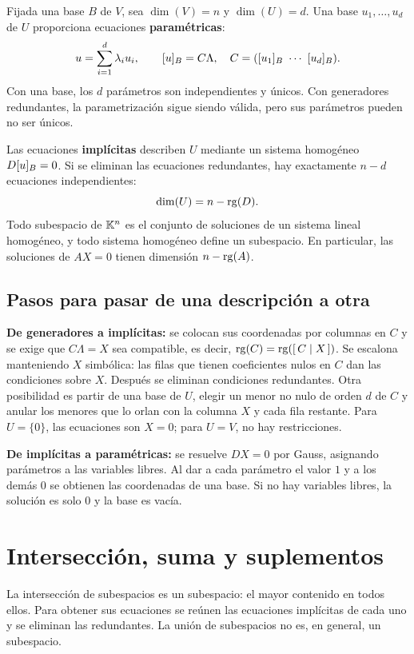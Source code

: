Fijada una base $B$ de $V$, sea $\dim(V)=n$ y $\dim(U)=d$.
Una base $u_1,\ldots,u_d$ de $U$ proporciona ecuaciones
\textbf{paramétricas}:
\[
 u=\sum_{i=1}^d\lambda_i u_i,\qquad
 [u]_{B}=C\Lambda,
 \quad C=([u_1]_{B}\ \cdots\ [u_d]_{B}).
\]
Con una base, los $d$ parámetros son independientes y únicos.
Con generadores redundantes, la parametrización sigue siendo válida,
pero sus parámetros pueden no ser únicos.

Las ecuaciones \textbf{implícitas} describen $U$ mediante un sistema
homogéneo $D[u]_{B}=0$. Si se eliminan las ecuaciones redundantes,
hay exactamente $n-d$ ecuaciones independientes:
\[
 \dim(U)=n-\operatorname{rg}(D).
\]
Todo subespacio de $\mathbb{K}^n$ es el conjunto de soluciones de un sistema
lineal homogéneo, y todo sistema homogéneo define un subespacio.
En particular, las soluciones de $AX=0$ tienen dimensión $n-\operatorname{rg}(A)$.

\subsection*{Pasos para pasar de una descripción a otra}

\textbf{De generadores a implícitas:} se colocan sus coordenadas por columnas
en $C$ y se exige que $C\Lambda=X$ sea compatible, es decir,
$\operatorname{rg}(C)=\operatorname{rg}([\,C\mid X\,])$. Se escalona manteniendo $X$ simbólica:
las filas que tienen coeficientes nulos en $C$ dan las condiciones sobre $X$.
Después se eliminan condiciones redundantes. Otra posibilidad es partir
de una base de $U$, elegir un menor no nulo de orden $d$ de $C$ y anular
los menores que lo orlan con la columna $X$ y cada fila restante.
Para $U=\{0\}$, las ecuaciones son $X=0$; para $U=V$, no hay restricciones.

\textbf{De implícitas a paramétricas:} se resuelve $DX=0$ por Gauss,
asignando parámetros a las variables libres. Al dar a cada parámetro
el valor $1$ y a los demás $0$ se obtienen las coordenadas de una base.
Si no hay variables libres, la solución es solo $0$ y la base es vacía.

\section{Intersección, suma y suplementos}
\label{sec:suma-subespacios}

La intersección de subespacios es un subespacio: el mayor contenido en
todos ellos. Para obtener sus ecuaciones se reúnen las ecuaciones
implícitas de cada uno y se eliminan las redundantes.
La unión de subespacios no es, en general, un subespacio.


